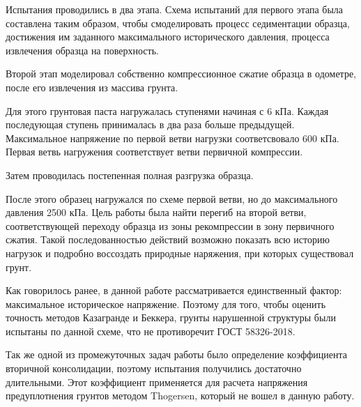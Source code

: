 Испытания проводились в два этапа.
Схема испытаний для первого этапа была составлена таким образом, чтобы смоделировать процесс седиментации образца, достижения им заданного максимального исторического давления, процесса извлечения образца на поверхность.

Второй этап моделировал собственно компрессионное сжатие образца в одометре, после его извлечения из массива грунта.

Для этого грунтовая паста нагружалась ступенями начиная с 6 кПа.
Каждая последующая ступень принималась в два раза больше предыдущей.
Максимальное напряжение по первой ветви нагрузки соответсвовало 600 кПа.
Первая ветвь нагружения соответствует ветви первичной компрессии.

Затем проводилась постепенная полная разгрузка образца.

После этого образец нагружался по схеме первой ветви, но до максимального давления 2500 кПа.
Цель работы была найти перегиб на второй ветви, соответствующей переходу образца из зоны рекомпрессии в зону первичного сжатия.
Такой последованностью действий возможно показать всю историю нагрузок и подробно воссоздать природные наряжения, при которых существовал грунт. 

Как говорилось ранее, в данной работе рассматривается единственный фактор: максимальное историческое напряжение. Поэтому для того, чтобы оценить точность методов Казагранде и Беккера, грунты нарушенной структуры были испытаны по данной схеме, что не противоречит ГОСТ 58326-2018.

Так же одной из промежуточных задач работы было определение коэффициента вторичной консолидации, поэтому испытания получились достаточно длительными. Этот коэффициент применяется для расчета напряжения предуплотнения грунтов методом Thogersen, который не вошел в данную работу.
 
